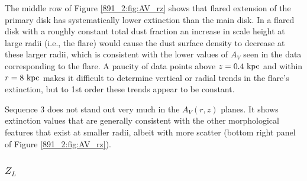 The middle row of Figure \ref{891_2:fig:AV_rz} shows that flared extension
of the primary disk has systematically lower extinction than the main
disk. In a flared disk with a roughly constant total dust fraction an
increase in scale height at large radii (i.e., the flare) would cause
the dust surface density to decrease at these larger radii, which is
consistent with the lower values of $A_V$ seen in the data
corresponding to the flare. A paucity of data points above $z =
0.4~\mathrm{kpc} $ and within $r = 8~\mathrm{kpc} $ makes it difficult to
determine vertical or radial trends in the flare's extinction, but to
1st order these trends appear to be constant.


Sequence 3 does not stand out very much in the $A_V(r,z)$ planes. It
shows extinction values that are generally consistent with the other
morphological features that exist at smaller radii, albeit with more
scatter (bottom right panel of Figure \ref{891_2:fig:AV_rz}).


\subsubsection{{\Large $Z_L$}}

